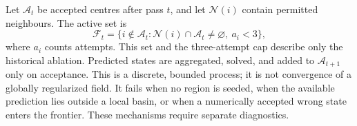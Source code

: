 Let $\mathcal A_t$ be accepted centres after pass $t$, and let $\mathcal N(i)$ contain permitted neighbours. The active set is
\begin{equation}
\mathcal F_t=\{i\notin\mathcal A_t:\mathcal N(i)\cap\mathcal A_t\ne\varnothing,\ a_i<3\},
\end{equation}
where $a_i$ counts attempts. This set and the three-attempt cap describe only the historical ablation. Predicted states are aggregated, solved, and added to $\mathcal A_{t+1}$ only on acceptance. This is a discrete, bounded process; it is not convergence of a globally regularized field. It fails when no region is seeded, when the available prediction lies outside a local basin, or when a numerically accepted wrong state enters the frontier. These mechanisms require separate diagnostics.
